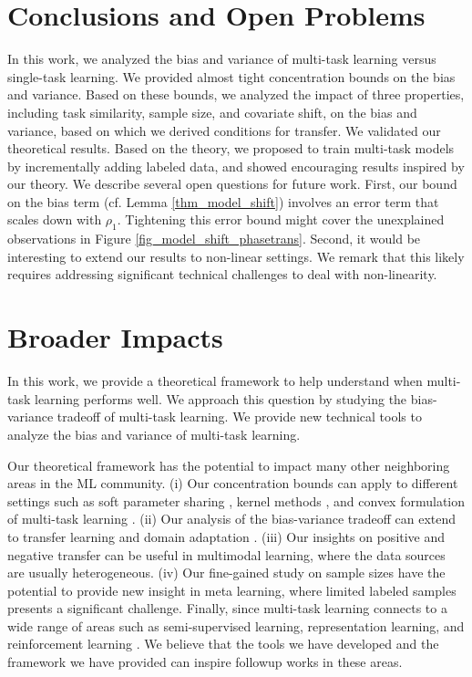 

\section{Conclusions and Open Problems}

In this work, we analyzed the bias and variance of multi-task learning versus single-task learning.
We provided almost tight concentration bounds on the bias and variance.
Based on these bounds, we analyzed the impact of three properties, including task similarity, sample size, and covariate shift, on the bias and variance, based on which we derived conditions for transfer.
We validated our theoretical results.
Based on the theory, we proposed to train multi-task models by incrementally adding labeled data, and showed encouraging results inspired by our theory.
We describe several open questions for future work.
First, our bound on the bias term (cf. Lemma \ref{thm_model_shift}) involves an error term that scales down with $\rho_1$.
Tightening this error bound might cover the unexplained observations in Figure \ref{fig_model_shift_phasetrans}.
Second, it would be interesting to extend our results to non-linear settings.
We remark that this likely requires addressing significant technical challenges  to deal with non-linearity.


\iffalse
\newpage
\section*{Broader Impacts}

In this work, we provide a theoretical framework to help understand when multi-task learning performs well.
We approach this question by studying the bias-variance tradeoff of multi-task learning.
We provide new technical tools to analyze the bias and variance of multi-task learning.

Our theoretical framework has the potential to impact many other neighboring areas in the ML community.
(i) Our concentration bounds can apply to different settings such as soft parameter sharing \cite{R17} , kernel methods \cite{EMP05}, and convex formulation of multi-task learning \cite{ZY14}.
(ii) Our analysis of the bias-variance tradeoff can extend to transfer learning and domain adaptation \cite{K18}.
(iii) Our insights on positive and negative transfer can be useful in multimodal learning, where the data sources are usually heterogeneous.
(iv) Our fine-gained study on sample sizes have the potential to provide new insight in meta learning, where limited labeled samples presents a significant challenge.
Finally, since multi-task learning connects to a wide range of areas \cite{V20} such as semi-supervised learning, representation learning, and reinforcement learning \cite{YKGLHF20}.%
We believe that the tools we have developed and the framework we have provided can inspire followup works in these areas.

